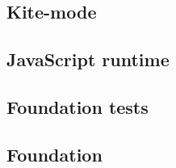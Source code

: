 
\subsection{Kite-mode}
\label{kite-mode}


\subsection{JavaScript runtime}
\label{kt-runtime}


\subsection{Foundation tests}
\label{sec:foundation-tests}


\subsection{Foundation}
\label{foundation}


